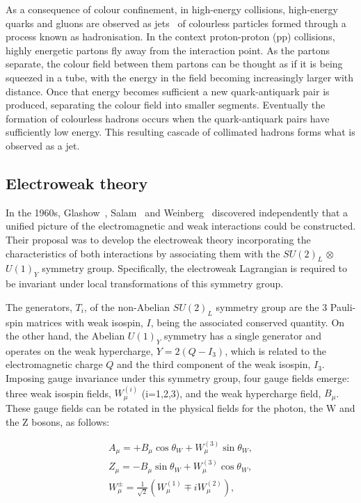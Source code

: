 As a consequence of colour confinement, in high-energy collisions, high-energy quarks and gluons are observed as jets~\cite{Hadronisation_Jets} of colourless particles formed through a process known as hadronisation. In the context proton-proton (pp) collisions, highly energetic partons fly away from the interaction point. As the partons separate, the colour field between them partons can be thought as if it is being squeezed in a tube, with the energy in the field becoming increasingly larger with distance. Once that energy becomes sufficient a new quark-antiquark pair is produced, separating the colour field into smaller segments. Eventually the formation of colourless hadrons occurs when the quark-antiquark pairs have sufficiently low energy. This resulting cascade of collimated hadrons forms what is observed as a jet.

\subsection{Electroweak theory}

In the 1960s, Glashow~\cite{Glashow}, Salam~\cite{Salam} and Weinberg~\cite{Weinberg} discovered independently that a unified picture of the electromagnetic and weak interactions could be constructed. Their proposal was to develop the electroweak theory incorporating the characteristics of both interactions by associating them with the $SU(2)_{L}$ $\otimes$ $U(1)_{Y}$ symmetry group. Specifically, the electroweak Lagrangian is required to be invariant under local transformations of this symmetry group.

The generators, $T_{i}$, of the non-Abelian $SU(2)_{L}$ symmetry group are the 3 Pauli-spin matrices with weak isospin, $I$, being the associated conserved quantity. On the other hand, the Abelian $U(1)_{Y}$ symmetry has a single generator and operates on the weak hypercharge, $Y = 2(Q-I_{3})$, which is related to the electromagnetic charge $Q$ and the third component of the weak isospin, $I_{3}$. Imposing gauge invariance under this symmetry group, four gauge fields emerge: three weak isospin fields, $W_{\mu}^{(i)}$ (i=1,2,3), and the weak hypercharge field, $B_{\mu}$. These gauge fields can be rotated in the physical fields for the photon, the W and the Z bosons, as follows:

\begin{equation}
\begin{array}{c}
A_{\mu} = + B_{\mu} \cos{\theta_{W}} + W_{\mu}^{(3)} \sin{\theta_{W}}, \\
Z_{\mu} = - B_{\mu} \sin{\theta_{W}} + W_{\mu}^{(3)} \cos{\theta_{W}}, \\
W_{\mu}^{\pm} = \frac{1}{\sqrt{2}} (W_{\mu}^{(1)} \mp iW_{\mu}^{(2)}),
\end{array}
\label{Equation:Introduction_PhysicalGaugeFields}
\end{equation}

